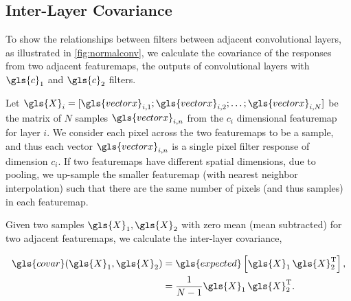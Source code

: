 \documentclass[thesis]{subfiles}
\begin{document}
	\subsection{Inter-Layer Covariance}
	\label{interlayercovar}
	To show the relationships between filters between adjacent convolutional layers, as illustrated in \cref{fig:normalconv}, we calculate the covariance of the responses from two adjacent \glspl{featuremap}, the outputs of convolutional layers with $\gls{c}_1$ and $\gls{c}_2$ filters.
	
	Let $\gls{X}_i = [\gls{vectorx}_{i,1}; \gls{vectorx}_{i,2}; \ldots ; \gls{vectorx}_{i,N}]$ be the matrix of $N$ samples $\gls{vectorx}_{i,n}$ from the $c_i$ dimensional \gls{featuremap} for layer $i$. We consider each pixel across the two \glspl{featuremap} to be a sample, and thus each vector $\gls{vectorx}_{i,n}$ is a single pixel filter response of dimension $c_i$. If two \glspl{featuremap} have different spatial dimensions, due to pooling, we up-sample the smaller \gls{featuremap} (with nearest neighbor interpolation) such that there are the same number of pixels (and thus samples) in each \gls{featuremap}.
	
	Given two samples $\gls{X}_1, \gls{X}_2$ with zero mean (\ie mean subtracted) for two adjacent \glspl{featuremap}, we calculate the inter-layer covariance,
	
	\begin{align}
	\gls{covar}(\gls{X}_1, \gls{X}_2) &= \gls{expected}\left[\gls{X}_1\,\gls{X}_2^\textrm{T}\right],\\
	&= \frac{1}{N-1} \gls{X}_1\,\gls{X}_2^\textrm{T}.
	\end{align}
	
\end{document}
